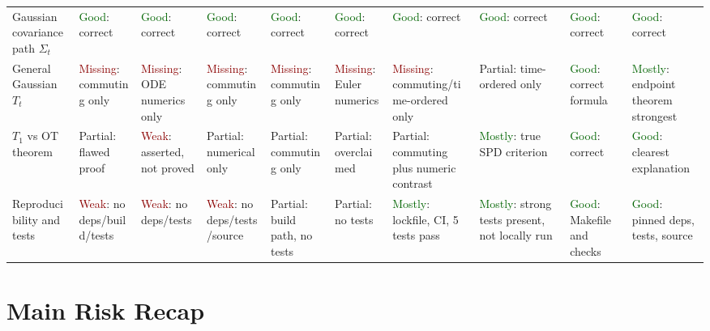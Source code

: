 \documentclass[10pt]{article}
\newcommand{\good}{\textcolor{darkgreen}{Good}}
\newcommand{\mostly}{\textcolor{darkgreen}{Mostly}}
\newcommand{\partcov}{\textcolor{darkyellow}{Partial}}
\newcommand{\weak}{\textcolor{darkred}{Weak}}
\newcommand{\missing}{\textcolor{darkred}{Missing}}
\begin{document}
\begin{landscape}
\begin{center}
\begin{tabularx}{\linewidth}{L{2.4cm} Y Y Y Y Y Y Y Y Y}
Gaussian covariance path \(\Sigma_t\) & \good: correct & \good: correct & \good: correct & \good: correct & \good: correct & \good: correct & \good: correct & \good: correct & \good: correct \\
General Gaussian \(T_t\) & \missing: commuting only & \missing: ODE numerics only & \missing: commuting only & \missing: commuting only & \missing: Euler numerics & \missing: commuting/time-ordered only & \partcov: time-ordered only & \good: correct formula & \mostly: endpoint theorem strongest \\
\(T_1\) vs OT theorem & \partcov: flawed proof & \weak: asserted, not proved & \partcov: numerical only & \partcov: commuting only & \partcov: overclaimed & \partcov: commuting plus numeric contrast & \mostly: true SPD criterion & \good: correct & \good: clearest explanation \\
Reproducibility and tests & \weak: no deps/build/tests & \weak: no deps/tests & \weak: no deps/tests/source & \partcov: build path, no tests & \partcov: no tests & \mostly: lockfile, CI, 5 tests pass & \mostly: strong tests present, not locally run & \good: Makefile and checks & \good: pinned deps, tests, source \\
\bottomrule
\end{tabularx}
\end{center}
\end{landscape}

\section*{Main Risk Recap}
\end{document}
